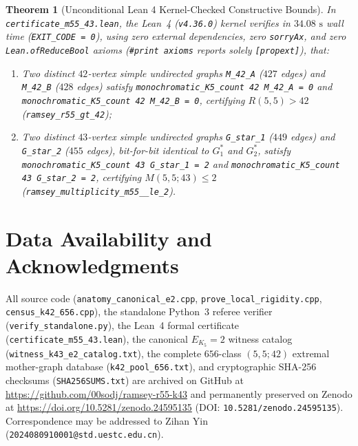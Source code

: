\documentclass[11pt,a4paper]{article}
\theoremstyle{plain}
\newtheorem{theorem}{Theorem}[section]
\theoremstyle{definition}
\begin{document}
\begin{theorem}[Unconditional Lean 4 Kernel-Checked Constructive Bounds]\label{thm:lean-cert}
In \texttt{certificate\_\allowbreak m55\_\allowbreak 43.lean}, the Lean~4 (\texttt{v4.36.0}) kernel verifies in $34.08\text{ s}$ wall time (\texttt{EXIT\_CODE = 0}), using zero external dependencies, zero \texttt{sorryAx}, and zero \texttt{Lean.\allowbreak ofReduceBool} axioms (\texttt{\#print axioms} reports solely \texttt{[propext]}), that:
\begin{enumerate}
  \item Two distinct $42$-vertex simple undirected graphs \texttt{M\_42\_A} ($427$ edges) and \texttt{M\_42\_B} ($428$ edges) satisfy \texttt{monochromatic\_\allowbreak K5\_\allowbreak count 42 M\_42\_A = 0} and \texttt{monochromatic\_\allowbreak K5\_\allowbreak count 42 M\_42\_B = 0}, certifying $R(5,5) > 42$ (\texttt{ramsey\_\allowbreak r55\_\allowbreak gt\_42});
  \item Two distinct $43$-vertex simple undirected graphs \texttt{G\_star\_1} ($449$ edges) and \texttt{G\_star\_2} ($455$ edges), bit-for-bit identical to $G^*_1$ and $G^*_2$, satisfy \texttt{monochromatic\_\allowbreak K5\_\allowbreak count 43 G\_star\_1 = 2} and \texttt{monochromatic\_\allowbreak K5\_\allowbreak count 43 G\_star\_2 = 2}, certifying $M(5,5;43) \le 2$ (\texttt{ramsey\_\allowbreak multiplicity\_\allowbreak m55\_\_\allowbreak le\_2}).
\end{enumerate}
\end{theorem}

\section*{Data Availability and Acknowledgments}

All source code (\nolinkurl{anatomy_canonical_e2.cpp}, \nolinkurl{prove_local_rigidity.cpp}, \nolinkurl{census_k42_656.cpp}), the standalone Python~3 referee verifier (\nolinkurl{verify_standalone.py}), the Lean~4 formal certificate (\nolinkurl{certificate_m55_43.lean}), the canonical $E_{K_5}=2$ witness catalog (\nolinkurl{witness_k43_e2_catalog.txt}), the complete $656$-class $(5,5;42)$ extremal mother-graph database (\nolinkurl{k42_pool_656.txt}), and cryptographic SHA-256 checksums (\nolinkurl{SHA256SUMS.txt}) are archived on GitHub at \url{https://github.com/00sodj/ramsey-r55-k43} and permanently preserved on Zenodo at \url{https://doi.org/10.5281/zenodo.24595135} (DOI: \nolinkurl{10.5281/zenodo.24595135}). Correspondence may be addressed to Zihan Yin (\nolinkurl{2024080910001@std.uestc.edu.cn}).
\end{document}
